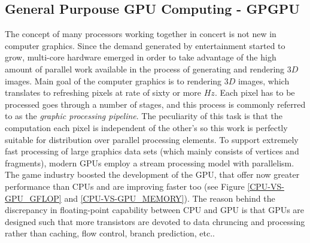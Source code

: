     \subsection{General Purpouse GPU Computing - GPGPU}
    The concept of many processors working together in concert is not new in computer graphics. Since the demand generated by entertainment started to grow, multi-core hardware emerged in order to take advantage of the high amount of parallel work available in the process of generating and rendering $3D$ images.
    Main goal of the computer graphics is to  rendering $3D$ images, which translates to refreshing pixels at rate of sixty or more $\si{Hz}$. Each pixel has to be processed goes through a number of stages, and this process is commonly referred to as the \emph{graphic processing pipeline}. The peculiarity of this task is that the  computation each pixel is independent of the other's so this work is perfectly suitable for distribution over parallel processing elements. To support extremely fast processing of large graphics data sets (which mainly consists of vertices and fragments), modern GPUs employ a stream processing model with parallelism.
    The game industry boosted the development of the GPU, that offer now greater
    performance than CPUs and are improving faster too (see Figure
    \ref{CPU-VS-GPU_GFLOP} and \ref{CPU-VS-GPU_MEMORY}).
    The reason behind the discrepancy in floating-point capability between CPU and  GPU is that GPUs are designed such that more transistors are devoted to data chruncing and processing rather than caching, flow control, branch prediction, etc..
    
